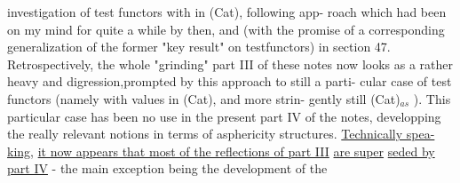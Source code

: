 investigation of test functors with  in (Cat),  following  app-%
roach which had  been on my mind for quite a while by then,  and  
  (with the promise of a corresponding generalization of the former
"key result" on testfunctors)  in section 47.  Retrospectively,  the
whole "grinding" part III of these notes  now looks as a rather heavy
and  digression,prompted by this approach\xout{,}   to still a parti-%
cular case of test functors (namely with values in (Cat),  and more strin-%
gently still   (Cat)$_{as}$ ).  
This particular case has been   no
 use in the present part IV of the notes,  developping the really
relevant notions in terms of asphericity structures.  \uline{Technically spea-}%
\uline{king},  \uline{it now appears that most of the reflections of part III}  \uline{are super}%
\uline{seded by part IV}  -  the main exception being the development of the

